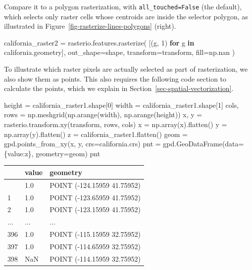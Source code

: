 \documentclass[
  letterpaper,
]{krantz}
\newenvironment{Shaded}{\begin{snugshade}}{\end{snugshade}}
\newcommand{\ControlFlowTok}[1]{\textcolor[rgb]{0.00,0.23,0.31}{\textbf{#1}}}
\newcommand{\DecValTok}[1]{\textcolor[rgb]{0.68,0.00,0.00}{#1}}
\newcommand{\KeywordTok}[1]{\textcolor[rgb]{0.00,0.23,0.31}{\textbf{#1}}}
\newcommand{\NormalTok}[1]{\textcolor[rgb]{0.00,0.23,0.31}{#1}}
\newcommand{\OperatorTok}[1]{\textcolor[rgb]{0.37,0.37,0.37}{#1}}
\newcommand{\StringTok}[1]{\textcolor[rgb]{0.13,0.47,0.30}{#1}}
\begin{document}
Compare it to a polygon rasterization, with \texttt{all\_touched=False}
(the default), which selects only raster cells whose centroids are
inside the selector polygon, as illustrated in
Figure~\ref{fig-rasterize-lines-polygons} (right).

\begin{Shaded}
\begin{Highlighting}[]
\NormalTok{california\_raster2 }\OperatorTok{=}\NormalTok{ rasterio.features.rasterize(}
\NormalTok{    [(g, }\DecValTok{1}\NormalTok{) }\ControlFlowTok{for}\NormalTok{ g }\KeywordTok{in}\NormalTok{ california.geometry],}
\NormalTok{    out\_shape}\OperatorTok{=}\NormalTok{shape,}
\NormalTok{    transform}\OperatorTok{=}\NormalTok{transform,}
\NormalTok{    fill}\OperatorTok{=}\NormalTok{np.nan}
\NormalTok{)}
\end{Highlighting}
\end{Shaded}

To illustrate which raster pixels are actually selected as part of
rasterization, we also show them as points. This also requires the
following code section to calculate the points, which we explain in
Section~\ref{sec-spatial-vectorization}.

\begin{Shaded}
\begin{Highlighting}[]
\NormalTok{height }\OperatorTok{=}\NormalTok{ california\_raster1.shape[}\DecValTok{0}\NormalTok{]}
\NormalTok{width }\OperatorTok{=}\NormalTok{ california\_raster1.shape[}\DecValTok{1}\NormalTok{]}
\NormalTok{cols, rows }\OperatorTok{=}\NormalTok{ np.meshgrid(np.arange(width), np.arange(height))}
\NormalTok{x, y }\OperatorTok{=}\NormalTok{ rasterio.transform.xy(transform, rows, cols)}
\NormalTok{x }\OperatorTok{=}\NormalTok{ np.array(x).flatten()}
\NormalTok{y }\OperatorTok{=}\NormalTok{ np.array(y).flatten()}
\NormalTok{z }\OperatorTok{=}\NormalTok{ california\_raster1.flatten()}
\NormalTok{geom }\OperatorTok{=}\NormalTok{ gpd.points\_from\_xy(x, y, crs}\OperatorTok{=}\NormalTok{california.crs)}
\NormalTok{pnt }\OperatorTok{=}\NormalTok{ gpd.GeoDataFrame(data}\OperatorTok{=}\NormalTok{\{}\StringTok{\textquotesingle{}value\textquotesingle{}}\NormalTok{:z\}, geometry}\OperatorTok{=}\NormalTok{geom)}
\NormalTok{pnt}
\end{Highlighting}
\end{Shaded}

\begin{longtable}[]{@{}lll@{}}
\toprule\noalign{}
& value & geometry \\
\midrule\noalign{}
\endhead
\bottomrule\noalign{}
\endlastfoot
0 & 1.0 & POINT (-124.15959 41.75952) \\
1 & 1.0 & POINT (-123.65959 41.75952) \\
2 & 1.0 & POINT (-123.15959 41.75952) \\
... & ... & ... \\
396 & 1.0 & POINT (-115.15959 32.75952) \\
397 & 1.0 & POINT (-114.65959 32.75952) \\
398 & NaN & POINT (-114.15959 32.75952) \\
\end{longtable}
\end{document}
